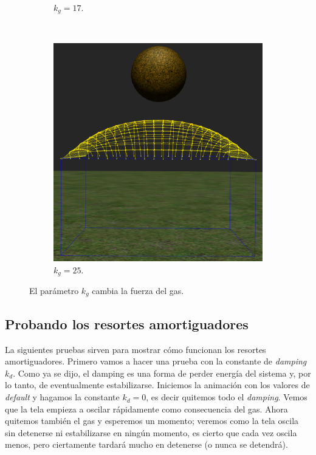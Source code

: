 \begin{figure}
\begin{subfigure}[b]{0.30\textwidth}
    \caption{$k_g=17$.}
  \end{subfigure}
~
  \begin{subfigure}[b]{0.30\textwidth}
    \includegraphics[width=\textwidth]{Img/04/varPress3}
    \caption{$k_g=25$.}
  \end{subfigure}
 \caption[Experimento: Variar la fuerza del gas]{El parámetro $k_g$ cambia la fuerza del gas.} 
 \label{pres:testVar}
\end{figure}

\subsection{Probando los resortes amortiguadores}
La siguientes pruebas sirven para mostrar cómo funcionan los resortes amortiguadores.
Primero vamos a hacer una prueba con la constante de \emph{\textenglish{damping}} $k_d$.
Como ya se dijo, el damping es una forma de perder energía del sistema y, por lo tanto, de eventualmente estabilizarse.
Iniciemos la animación con los valores de \emph{\textenglish{default}} y hagamos la constante $k_d=0$, es decir quitemos todo el \emph{\textenglish{damping}}.
Vemos que la tela empieza a oscilar rápidamente como consecuencia del gas.
Ahora quitemos también el gas y esperemos un momento; veremos como la tela oscila sin detenerse ni estabilizarse en ningún momento, es cierto que cada vez oscila menos, pero ciertamente tardará mucho en detenerse (o nunca se detendrá).

